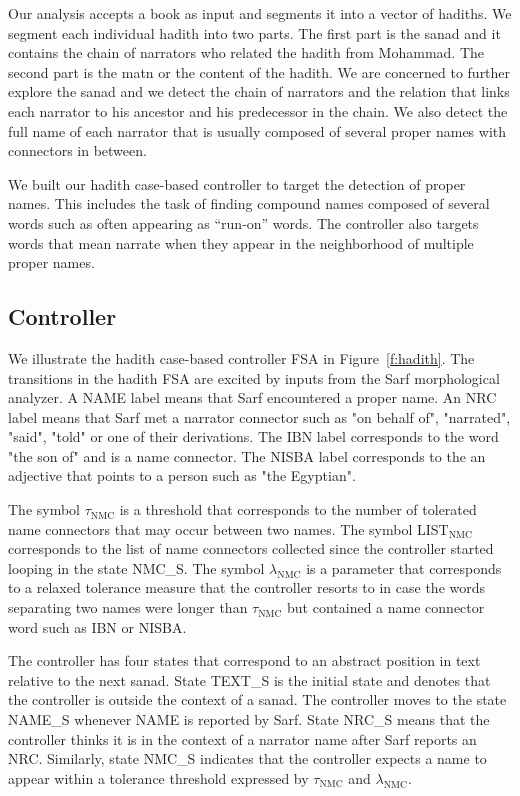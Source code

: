 \documentclass[11pt,letterpaper]{article}
\begin{document}
Our analysis accepts a book as input
and segments it into a vector of hadiths. 
We segment each individual hadith into two parts. 
The first part is the sanad and it
contains the chain of narrators who related the hadith
from Mohammad. 
The second part is the matn or the content
of the hadith. 
We are concerned to further explore the sanad and
we detect the chain of narrators and 
the relation that links each narrator to his ancestor and 
his predecessor in the chain. 
We also detect the full name of each narrator that is
usually composed of several proper names with connectors
in between. 

We built our hadith case-based controller to target
the detection of proper names. 
This includes the task of finding compound names 
composed of several words such as  often
appearing as ``run-on'' words.
The controller also targets words that mean narrate when
they appear in the neighborhood of multiple proper names. 

\subsection{Controller}


We illustrate the hadith case-based controller FSA 
in Figure~\ref{f:hadith}. 
The transitions in the hadith FSA are excited
by inputs from the Sarf morphological analyzer. 
A NAME label means that Sarf encountered a proper name.
An NRC label means that Sarf met a narrator connector such as
 "on behalf of",  "narrated",  "said", 
 "told" or one of their derivations. 
The IBN label corresponds to the word  "the son of" and is a name connector.
The NISBA label corresponds to the an adjective that points to a person such 
as  "the Egyptian". 

The symbol $\tau_{\mbox{NMC}}$ is a threshold
that corresponds to the number of tolerated name connectors 
that may occur between two names. 
The symbol LIST$_{\mbox{NMC}}$ corresponds to the list 
of name connectors collected since the controller
started looping in the state NMC\_S. 
The symbol $\lambda_{\mbox{NMC}}$ is a parameter 
that corresponds to a relaxed tolerance measure that
the controller resorts to in case the words separating
two names were longer than $\tau_{\mbox{NMC}}$ but 
contained a name connector word such as IBN or NISBA.

The controller has four states that correspond to 
an abstract position in text relative to the next sanad. 
State TEXT\_S is the initial state and denotes that
the controller is outside the context of a sanad.
The controller moves to the state NAME\_S whenever
NAME is reported by Sarf.
State NRC\_S means that the controller thinks it is in the context
of a narrator name after Sarf reports an NRC.
Similarly, state NMC\_S
indicates that the controller expects a name to appear within 
a tolerance threshold expressed by 
$\tau_{\mbox{NMC}}$ and $\lambda_{\mbox{NMC}}$.
\end{document}
